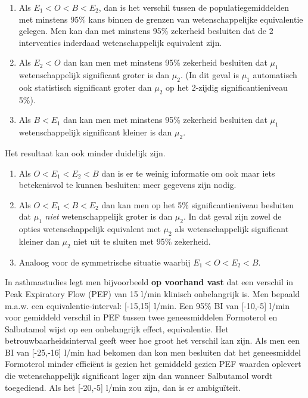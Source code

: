 \documentclass[
  dutch,
  letterpaper,
  12pt]{book}
\providecommand{\tightlist}{%
  \setlength{\itemsep}{0pt}\setlength{\parskip}{0pt}}
\theoremstyle{definition}
\theoremstyle{definition}
\theoremstyle{definition}
\theoremstyle{remark}
\begin{document}
\begin{enumerate}
\def\labelenumi{\arabic{enumi}.}
\item
  Als \(E_1 < O < B < E_2\), dan is het verschil tussen de
  populatiegemiddelden met minstens 95\% kans binnen de grenzen van
  wetenschappelijke equivalentie gelegen. Men kan dan met minstens 95\%
  zekerheid besluiten dat de 2 interventies inderdaad wetenschappelijk
  equivalent zijn.
\item
  Als \(E_2 < O\) dan kan men met minstens 95\% zekerheid besluiten dat
  \(\mu_1\) wetenschappelijk significant groter is dan \(\mu_2\). (In
  dit geval is \(\mu_1\) automatisch ook statistisch significant groter
  dan \(\mu_2\) op het 2-zijdig significantieniveau 5\%).
\item
  Als \(B < E_1\) dan kan men met minstens 95\% zekerheid besluiten dat
  \(\mu_1\) wetenschappelijk significant kleiner is dan \(\mu_2.\)
\end{enumerate}

Het resultaat kan ook minder duidelijk zijn.

\begin{enumerate}
\def\labelenumi{\arabic{enumi}.}
\tightlist
\item
  Als \(O < E_1 < E_2 < B\) dan is er te weinig informatie om ook maar
  iets betekenisvol te kunnen besluiten: meer gegevens zijn nodig.
\item
  Als \(O < E_1 < B < E_2\) dan kan men op het 5\% significantieniveau
  besluiten dat \(\mu_1\) \emph{niet} wetenschappelijk groter is dan
  \(\mu_2\). In dat geval zijn zowel de opties wetenschappelijk
  equivalent met \(\mu_2\) als wetenschappelijk significant kleiner dan
  \(\mu_2\) niet uit te sluiten met 95\% zekerheid.
\item
  Analoog voor de symmetrische situatie waarbij \(E_1 < O < E_2 < B.\)
\end{enumerate}

In asthmastudies legt men bijvoorbeeld \textbf{op voorhand vast} dat een
verschil in Peak Expiratory Flow (PEF) van 15 l/min klinisch
onbelangrijk is. Men bepaald m.a.w. een equivalentie-interval:
{[}-15,15{]} l/min. Een 95\% BI van {[}-10,-5{]} l/min voor gemiddeld
verschil in PEF tussen twee geneesmiddelen Formoterol en Salbutamol
wijst op een onbelangrijk effect, equivalentie. Het
betrouwbaarheidsinterval geeft weer hoe groot het verschil kan zijn. Als
men een BI van {[}-25,-16{]} l/min had bekomen dan kon men besluiten dat
het geneesmiddel Formoterol minder efficiënt is gezien het gemiddeld
gezien PEF waarden oplevert die wetenschappelijk significant lager zijn
dan wanneer Salbutamol wordt toegediend. Als het {[}-20,-5{]} l/min zou
zijn, dan is er ambiguïteit.
\end{document}
